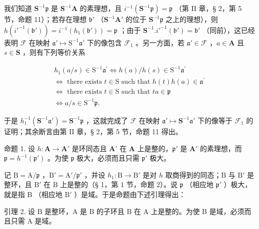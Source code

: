 我们知道 \(\mathbf{S}^{-1}\mathfrak{p}\) 是 \(\mathbf{S}^{-1}\mathbf{A}\) 的素理想，且 \(i^{-1}(\mathbf{S}^{-1}\mathfrak{p}) = \mathfrak{p}\) （第 II 章，§ 2，第 5 节，命题 11）；若存在理想 \(\mathfrak{b}'\) （\(\mathbf{S}^{-1}\mathbf{A}'\) 的位于 \(\mathbf{S}^{-1}\mathfrak{p}\) 之上的理想），则 \(h(i'^{-1}(\mathfrak{b}')) = i^{-1}(h_1(\mathfrak{b}')) = \mathfrak{p}\) ；由于 \(\mathbf{S}^{-1}.i'^{-1}(\mathfrak{b}') = \mathfrak{b}'\) （同前），这已经表明 \(\mathcal{F}\) 在映射 \(\mathfrak{a}'\mapsto\mathrm{S}^{-1}\mathfrak{a}'\) 下的像包含 \(\mathcal{F}_{1}\) 。另一方面，若 \(\mathfrak{a}'\in\mathcal{F}\) ，\(a\in\mathbf{A}\) 且 \(s\in\mathbf{S}\) ，则有下列等价关系

\[
\begin{array}{l} h _ {1} (a / s) \in \mathrm{S} ^ {- 1} \mathfrak {a} ^ {\prime} \Leftrightarrow h (a) / h (s) \in \mathrm{S} ^ {- 1} \mathfrak {a} ^ {\prime} \\ \Leftrightarrow \text { there   exists } t \in \mathrm{S} \text { such   that } h (t) h (a) \in \mathfrak {a} ^ {\prime} \\ \Leftrightarrow \text { there   exists } t \in \mathrm{S} \text { such   that } t a \in \mathfrak {p} \\ \Leftrightarrow a / s \in \mathrm{S} ^ {- 1} \mathfrak {p}. \end{array}
\]

于是 \(h_1^{-1}(\mathbf{S}^{-1}\mathfrak{a}') = \mathbf{S}^{-1}\mathfrak{p}\) ，这就完成了 \(\mathcal{F}\) 在映射 \(\mathfrak{a}' \mapsto \mathbf{S}^{-1}\mathfrak{a}'\) 下的像等于 \(\mathcal{F}_1\) 的证明；其余断言由第 II 章，§ 2，第 5 节，命题 11 得出。

命题 1. 设 \(h: \mathbf{A} \to \mathbf{A}'\) 是环同态且 \(\mathbf{A}'\) 在 \(\mathbf{A}\) 上是整的，\(\mathfrak{p}'\) 是 \(\mathbf{A}'\) 的素理想，而 \(\mathfrak{p} = h^{-1}(\mathfrak{p}')\) 。为使 \(\mathfrak{p}\) 极大，必须而且只需 \(\mathfrak{p}'\) 极大。

记 \(\mathrm{B} = \mathrm{A} / \mathfrak{p}\) ，\(\mathrm{B}' = \mathrm{A}' / \mathfrak{p}'\) ，并设 \(h_1 \colon \mathrm{B} \to \mathrm{B}'\) 是对 \(h\) 取商得到的同态；\(\mathrm{B}\) 与 \(\mathrm{B}'\) 是整环，且 \(\mathrm{B}'\) 在 \(\mathrm{B}\) 上是整的（§ 1，第 1 节，命题 2）。说 \(\mathfrak{p}\) （相应地 \(\mathfrak{p}'\) ）极大，就是指 \(\mathrm{B}\) （相应地 \(\mathrm{B}'\) ）是域。于是命题由下述引理得出：

引理 2. 设 B 是整环，A 是 B 的子环且 B 在 A 上是整的。为使 B 是域，必须而且只需 A 是域。

